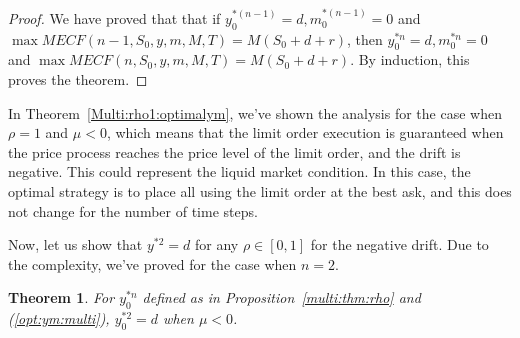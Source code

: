\documentclass[11pt]{article}
\theoremstyle{plain}
\numberwithin{equation}{section}
\newtheorem{thm}{Theorem}[section]
\begin{document}
\begin{proof}
We have proved that that if $y_0^{*(n-1)}=d, m_0^{*(n-1)}=0$ and  $\max MECF(n-1,S_0,y,m,M,T)=M (S_0 + d + r)$, then
$y_0^{*n}=d, m_0^{*n}=0$ and  $\max MECF(n,S_0,y,m,M,T)=M (S_0 + d + r)$. 
By induction, this proves the theorem.
\end{proof}

{
In Theorem~\ref{Multi:rho1:optimalym}, we've shown the analysis for the case when $\rho=1$ and $\mu<0$, which means that the limit order execution is guaranteed when the price process reaches the price level of the limit order, and the drift is negative. This could represent the liquid market condition. In this case, the optimal strategy is to place all using the limit order at the best ask, and this does not change for the number of time steps. 

\par Now, let us show that $y^{*2}=d$ for any $\rho \in [0,1]$ for the negative drift. Due to the complexity, we've proved for the case when $n=2$.
}


\begin{thm}\label{Multi:rho:optimaly}
For $y_0^{*n}$ defined as in Proposition~\ref{multi:thm:rho} and (\ref{opt:ym:multi}),  $y_0^{*2}=d$  when $\mu<0$. 
\end{thm}
\end{document}
